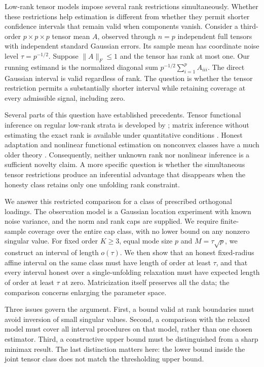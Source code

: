 \documentclass[11pt]{article}
\theoremstyle{remark}
\newcommand{\norm}[1]{\lVert #1\rVert}
\begin{document}
Low-rank tensor models impose several rank restrictions simultaneously. Whether these restrictions help estimation is different from whether they permit shorter confidence intervals that remain valid when components vanish. Consider a third-order $p\times p\times p$ tensor mean $A$, observed through $n=p$ independent full tensors with independent standard Gaussian errors. Its sample mean has coordinate noise level $\tau=p^{-1/2}$. Suppose $\norm A_F\le1$ and the tensor has rank at most one. Our running estimand is the normalized diagonal sum $p^{-1/2}\sum_{i=1}^p A_{iii}$. The direct Gaussian interval is valid regardless of rank. The question is whether the tensor restriction permits a substantially shorter interval while retaining coverage at every admissible signal, including zero.

Several parts of this question have established precedents. Tensor functional inference on regular low-rank strata is developed by \citet{xu2025}; matrix inference without estimating the exact rank is available under quantitative conditions \citep{choi2026}. Honest adaptation and nonlinear functional estimation on nonconvex classes have a much older theory \citep{cailow2004,cailownonconvex2004}. Consequently, neither unknown rank nor nonlinear inference is a sufficient novelty claim. A more specific question is whether the simultaneous tensor restrictions produce an inferential advantage that disappears when the honesty class retains only one unfolding rank constraint.

We answer this restricted comparison for a class of prescribed orthogonal loadings. The observation model is a Gaussian location experiment with known noise variance, and the norm and rank caps are supplied. We require finite-sample coverage over the entire cap class, with no lower bound on any nonzero singular value. For fixed order $K\ge3$, equal mode size $p$ and $M=\tau\sqrt p$, we construct an interval of length $o(\tau)$. We then show that an honest fixed-radius affine interval on the same class must have length of order at least $\tau$, and that every interval honest over a single-unfolding relaxation must have expected length of order at least $\tau$ at zero. Matricization itself preserves all the data; the comparison concerns enlarging the parameter space.

Three issues govern the argument. First, a bound valid at rank boundaries must avoid inversion of small singular values. Second, a comparison with the relaxed model must cover all interval procedures on that model, rather than one chosen estimator. Third, a constructive upper bound must be distinguished from a sharp minimax result. The last distinction matters here: the lower bound inside the joint tensor class does not match the thresholding upper bound.
\end{document}
